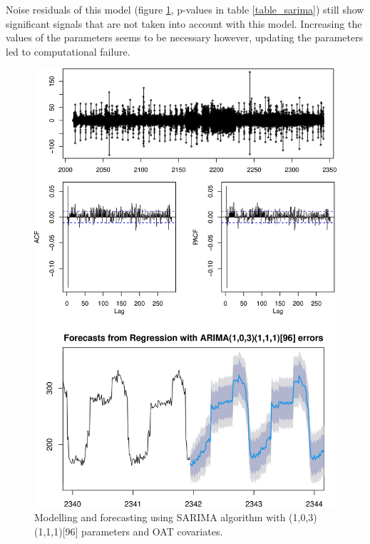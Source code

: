 Noise residuals of this model (figure \ref{figure_residuals_sarima}, p-values in table 
\ref{table_sarima}) still show significant signals that are not taken into account with this model. 
Increasing the values of the parameters seems to be necessary however, updating the parameters 
led to computational failure.

\begin{figure}[!h]
\centering
 \includegraphics[scale=0.45]{figures/figure_residuals_sarima.png}
 \caption{Modelling and forecasting using SARIMA algorithm with (1,0,3)(1,1,1)[96] parameters and OAT covariates.}
\label{figure_residuals_sarima}
\end{figure}


